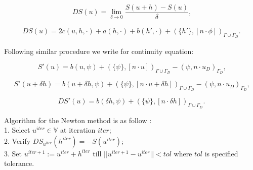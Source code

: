 \documentclass[a4paper,twoside,openright]{book}
\begin{document}
\begin{flushleft}
\begin{equation}
DS(u) = \lim_{\delta \to 0} \frac{S(u+h)-S(u)}{\delta} \textrm{,}
\end{equation}
\end{flushleft}

\begin{flushleft}
\begin{equation}
\begin{split}
DS(u) = 2 c(u,h,\cdot) + a(h,\cdot) + b(h',\cdot) + (\{h'\},[n\cdot \phi])_{\Gamma \cup \Gamma_D} \textrm{.}
\end{split}
\end{equation}
\end{flushleft}

Following similar procedure we write for continuity equation:\\
\begin{flushleft}
\begin{equation}
S'(u) = b(u,\psi) + (\{\psi\},[n \cdot u])_{\Gamma \cup \Gamma_D} - (\psi,n \cdot u_D)_{\Gamma_D} \textrm{,}
\end{equation}
\end{flushleft}

\begin{flushleft}
\begin{equation}
S'(u+\delta h) = b(u + \delta h,\psi) + (\{\psi\},[n \cdot u + \delta h])_{\Gamma \cup \Gamma_D} - (\psi,n \cdot u_D)_{\Gamma_D} \textrm{,}
\end{equation}
\end{flushleft}

\begin{flushleft}
\begin{equation}
DS'(u) = b(\delta h,\psi) + (\{\psi\},[n \cdot \delta h])_{\Gamma \cup \Gamma_D} \textrm{.}
\end{equation}
\end{flushleft}


Algorithm for the Newton method is as follow \cite{Haasdonk} :\\

1. Select $u^{iter} \in \mathbb{V}$ at iteration $iter$;\\

2. Verify $DS_{u^{iter}}(h^{iter}) = -S(u^{iter})$;\\

3. Set $u^{iter + 1} := u^{iter} + h^{iter}$ till $||u^{iter+1} - u^{iter}|| < tol$ where $tol$ is specified tolerance.\\
\end{document}
